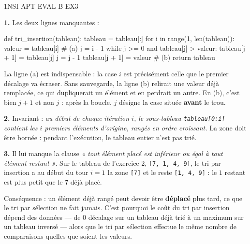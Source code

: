\begin{corrige}{1NSI-APT-EVAL-B-EX3}

\textbf{1.} Les deux lignes manquantes :
\begin{python}
def tri_insertion(tableau):
    tableau = tableau[:]
    for i in range(1, len(tableau)):
        valeur = tableau[i]               # (a)
        j = i - 1
        while j >= 0 and tableau[j] > valeur:
            tableau[j + 1] = tableau[j]
            j = j - 1
        tableau[j + 1] = valeur           # (b)
    return tableau
\end{python}
La ligne (a) est indispensable : la case $i$ est précisément celle que le premier décalage
va écraser. Sans sauvegarde, la ligne (b) relirait une valeur déjà remplacée, ce qui
dupliquerait un élément et en perdrait un autre. En (b), c'est bien $j+1$ et non $j$ :
après la boucle, $j$ désigne la case située \textbf{avant} le trou.

\textbf{2.} Invariant : \emph{au début de chaque itération $i$, le sous-tableau
\lstinline{tableau[0:i]} contient les $i$ premiers éléments d'origine, rangés en ordre
croissant.} La zone doit être bornée : pendant l'exécution, le tableau entier n'est pas
trié.

\textbf{3.} Il lui manque la clause \emph{« tout élément placé est inférieur ou égal à
tout élément restant »}. Sur le tableau de l'exercice 2, \lstinline{[7, 1, 4, 9]}, le tri
par insertion a au début du tour $i=1$ la zone \lstinline{[7]} et le reste
\lstinline{[1, 4, 9]} : le $1$ restant est plus petit que le $7$ déjà placé.

Conséquence : un élément déjà rangé peut devoir être \textbf{déplacé} plus tard, ce que le
tri par sélection ne fait jamais. C'est pourquoi le coût du tri par insertion dépend des
données — de $0$ décalage sur un tableau déjà trié à un maximum sur un tableau inversé —
alors que le tri par sélection effectue le même nombre de comparaisons quelles que soient
les valeurs.

\end{corrige}

